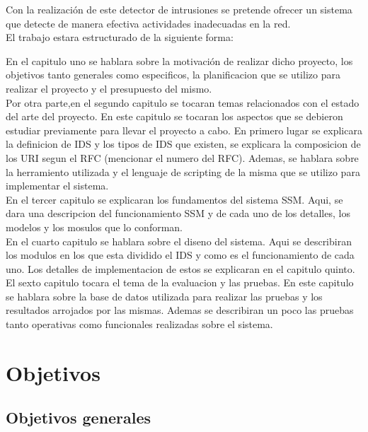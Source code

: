 \documentclass{article}
\begin{document}
Con la realización de este detector de intrusiones se pretende ofrecer un sistema que detecte de manera efectiva actividades inadecuadas en la red.\\

El trabajo estara estructurado de la siguiente forma:

En el capitulo uno se hablara sobre la motivación de realizar dicho proyecto, los objetivos tanto generales como especificos, la planificacion que se utilizo para realizar el proyecto y el presupuesto del mismo.\\ 

Por otra parte,en el segundo capitulo se tocaran temas relacionados con el estado del arte del proyecto. En este capitulo se tocaran los aspectos que se debieron estudiar previamente para llevar el proyecto a cabo. En primero lugar se explicara la definicion de IDS y los tipos de IDS que existen, se explicara la composicion de los URI segun el RFC (mencionar el numero del RFC). Ademas, se hablara sobre la herramiento utilizada y el lenguaje de scripting de la misma que se utilizo para implementar el sistema.\\

En el tercer capitulo se explicaran los fundamentos del sistema SSM. Aqui, se dara una descripcion del funcionamiento SSM y de cada uno de los detalles, los modelos y los mosulos que lo conforman.\\

En el cuarto capitulo se hablara sobre el diseno del sistema. Aqui se describiran los modulos en los que esta dividido el IDS y como es el funcionamiento de cada uno. Los detalles de implementacion de estos se explicaran en el capitulo quinto.\\

El sexto capitulo tocara el tema de la evaluacion y las pruebas. En este capitulo se hablara sobre la base de datos utilizada para realizar las pruebas y los resultados arrojados por las mismas. Ademas se describiran un poco las pruebas tanto operativas como funcionales realizadas sobre el sistema.\\

\section{Objetivos}

\subsection{Objetivos generales}
\end{document}
